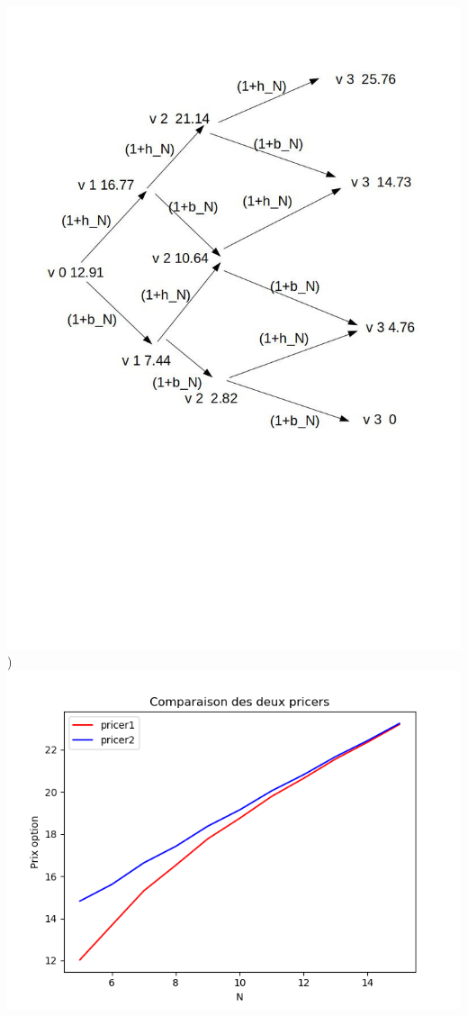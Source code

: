 \documentclass{exam}
\begin{document}
\espace
\includegraphics{question6tree.jpg}
\newline
{})
\newline
\espace
\includegraphics{question7.png}
\end{document}
